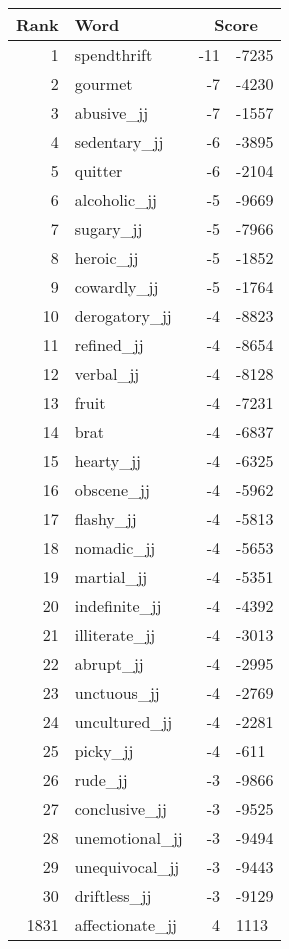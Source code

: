 \begin{longtable}[!htbp]{| rlr@{.}l |}
    \hline
    \textbf{Rank} & \textbf{Word} & \multicolumn{2}{c|}{\textbf{Score}} \\
    \hline
    \endhead
    1 & spendthrift & -11 & -7235 \\
    2 & gourmet & -7 & -4230 \\
    3 & abusive\_jj & -7 & -1557 \\
    4 & sedentary\_jj & -6 & -3895 \\
    5 & quitter & -6 & -2104 \\
    6 & alcoholic\_jj & -5 & -9669 \\
    7 & sugary\_jj & -5 & -7966 \\
    8 & heroic\_jj & -5 & -1852 \\
    9 & cowardly\_jj & -5 & -1764 \\
    10 & derogatory\_jj & -4 & -8823 \\
    11 & refined\_jj & -4 & -8654 \\
    12 & verbal\_jj & -4 & -8128 \\
    13 & fruit & -4 & -7231 \\
    14 & brat & -4 & -6837 \\
    15 & hearty\_jj & -4 & -6325 \\
    16 & obscene\_jj & -4 & -5962 \\
    17 & flashy\_jj & -4 & -5813 \\
    18 & nomadic\_jj & -4 & -5653 \\
    19 & martial\_jj & -4 & -5351 \\
    20 & indefinite\_jj & -4 & -4392 \\
    21 & illiterate\_jj & -4 & -3013 \\
    22 & abrupt\_jj & -4 & -2995 \\
    23 & unctuous\_jj & -4 & -2769 \\
    24 & uncultured\_jj & -4 & -2281 \\
    25 & picky\_jj & -4 & -611 \\
    26 & rude\_jj & -3 & -9866 \\
    27 & conclusive\_jj & -3 & -9525 \\
    28 & unemotional\_jj & -3 & -9494 \\
    29 & unequivocal\_jj & -3 & -9443 \\
    30 & driftless\_jj & -3 & -9129 \\
    1831 & affectionate\_jj & 4 & 1113 \\

\end{longtable}
